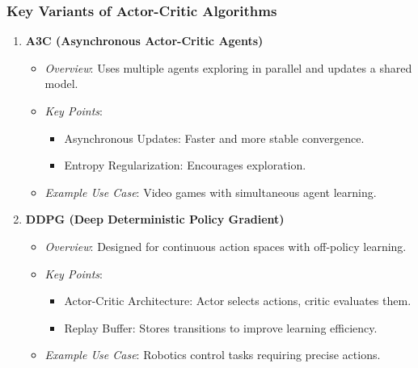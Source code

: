 \documentclass[aspectratio=169]{beamer}
\begin{document}
\begin{frame}[fragile]
    \frametitle{Key Variants of Actor-Critic Algorithms}
    \begin{enumerate}
        \item \textbf{A3C (Asynchronous Actor-Critic Agents)}
        \begin{itemize}
            \item \textit{Overview}: Uses multiple agents exploring in parallel and updates a shared model.
            \item \textit{Key Points}:
            \begin{itemize}
                \item Asynchronous Updates: Faster and more stable convergence.
                \item Entropy Regularization: Encourages exploration.
            \end{itemize}
            \item \textit{Example Use Case}: Video games with simultaneous agent learning.
        \end{itemize}

        \item \textbf{DDPG (Deep Deterministic Policy Gradient)}
        \begin{itemize}
            \item \textit{Overview}: Designed for continuous action spaces with off-policy learning.
            \item \textit{Key Points}:
            \begin{itemize}
                \item Actor-Critic Architecture: Actor selects actions, critic evaluates them.
                \item Replay Buffer: Stores transitions to improve learning efficiency.
            \end{itemize}
            \item \textit{Example Use Case}: Robotics control tasks requiring precise actions.
        \end{itemize}
    \end{enumerate}
\end{frame}
\end{document}
